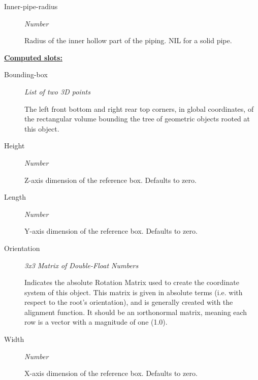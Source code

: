 \documentclass [11pt]{book}
\begin{document}
\begin{itemize}
\begin{description}

\item [Inner-pipe-radius]
\emph{Number}

 Radius of the inner hollow part of the piping. NIL for a solid pipe.




\end{description}






\textbf{
\underline{Computed slots:}}

\begin{description}

\item [Bounding-box]
\emph{List of two 3D points}

 The left front bottom and right rear top corners, in global coordinates,
of the rectangular volume bounding the tree of geometric objects rooted at this object.




\item [Height]
\emph{Number}

 Z-axis dimension of the reference box. Defaults to zero.




\item [Length]
\emph{Number}

 Y-axis dimension of the reference box. Defaults to zero.




\item [Orientation]
\emph{3x3 Matrix of Double-Float Numbers}

 Indicates the absolute Rotation Matrix used to create
the coordinate system of this object. This matrix is given in absolute terms (i.e. with
respect to the root's orientation), and is generally created with the alignment function.
It should be an 
\i{orthonormal} matrix, meaning each row is a vector with a magnitude
of one (1.0).




\item [Width]
\emph{Number}

 X-axis dimension of the reference box. Defaults to zero.





\end{description}
\end{itemize}
\end{document}
